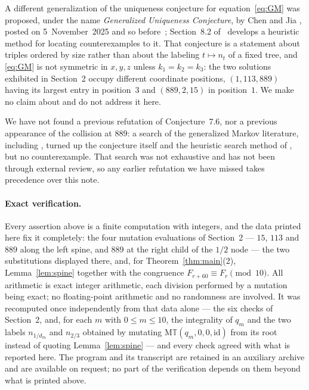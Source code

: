 \documentclass[11pt]{amsart}
\newcommand{\GMT}{\mathrm{M}\mathbb{T}}
\newcommand{\id}{\mathrm{id}}
\begin{document}
A different generalization of the uniqueness conjecture for
equation~\eqref{eq:GM} was proposed, under the name \emph{Generalized
Uniqueness Conjecture}, by Chen and Jia \cite[Conjecture~8.2]{ChenJia}, posted
on 5~November~2025 and so before~\cite{Gyoda}; Section~8.2 of~\cite{ChenJia}
develops a heuristic method for locating counterexamples to it. That
conjecture is a statement about triples ordered by size rather than about the
labeling $t\mapsto n_t$ of a fixed tree, and \eqref{eq:GM} is not symmetric in
$x,y,z$ unless $k_1=k_2=k_3$: the two solutions exhibited in Section~2 occupy
different coordinate positions, $(1,113,889)$ having its largest entry in
position~$3$ and $(889,2,15)$ in position~$1$. We make no claim about
\cite[Conjecture~8.2]{ChenJia} and do not address it here.

We have not found a previous refutation of Conjecture~7.6, nor a
previous appearance of the collision at $889$: a search of the generalized
Markov literature, including \cite{ChenJia,Gyoda,GyodaMatsushita}, turned up
the conjecture itself and the heuristic search method of
\cite[Section~8.2]{ChenJia}, but no counterexample. That search was not
exhaustive and has not been through external review, so any earlier refutation
we have missed takes precedence over this note.

\paragraph{Exact verification.}
Every assertion above is a finite computation with integers, and the data
printed here fix it completely: the four mutation evaluations of Section~2 ---
$15$, $113$ and $889$ along the left spine, and $889$ at the right child of the
$1/2$ node --- the two substitutions displayed there, and, for
Theorem~\ref{thm:main}(2), Lemma~\ref{lem:spine} together with the congruence
$F_{r+60}\equiv F_r\pmod{10}$. All arithmetic is exact integer arithmetic, each
division performed by a mutation being exact; no floating-point arithmetic and no
randomness are involved. It was recomputed once independently from that data
alone --- the six checks of Section~2, and, for each $m$ with $0\le m\le10$, the
integrality of $q_m$ and the two labels $n_{1/d_m}$ and $n_{2/3}$ obtained by
mutating $\GMT(q_m,0,0,\id)$ from its root instead of quoting
Lemma~\ref{lem:spine} --- and every check agreed with what is reported here. The
program and its transcript are retained in an auxiliary archive and are
available on request; no part of the verification depends on them beyond what is
printed above.
\end{document}
